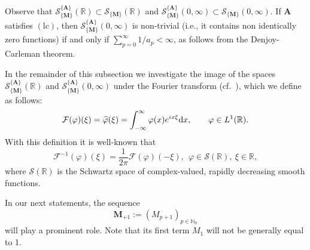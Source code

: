 \documentclass[12pt,a4paper]{article}
\newcommand{\N}{\mathbb{N}}
\newcommand{\R}{\mathbb{R}}
\newcommand{\SMA}{\mathcal{S}^{\{\A\}}_{\{\M\}}}
\newcommand{\M}{{\boldsymbol{M}}}
\newcommand{\A}{{\boldsymbol{A}}}
\newcommand{\dx}{{\rm d}x }
\newcommand{\lc}{\operatorname{(lc)}}
\theoremstyle{plain}
\theoremstyle{definition}
\numberwithin{equation}{section}
\begin{document}
Observe that $\SMA(\R)\subset \mathcal{S}_{\{\M\}}(\R)$ and $\SMA(0,\infty)\subset \mathcal{S}_{\{\M\}}(0,\infty)$. If $\A$ satisfies $\lc$, then $\SMA(0,\infty)$ is non-trivial (i.e., it contains non identically zero functions) if and only if $\sum_{p=0}^\infty 1/a_p<\infty$, as follows from the Denjoy-Carleman theorem.

In the remainder of this subsection we investigate the image of the spaces $\SMA(\R)$ and $\SMA(0,\infty)$
under the Fourier transform (cf.\ \cite[Sect.\ IV.6]{G-S}), which we define as follows:
$$
\mathcal{F}(\varphi)(\xi) = \widehat{\varphi}(\xi) = \int_{-\infty}^\infty \varphi(x) e^{ix\xi} \dx, \qquad \varphi \in L^1(\R).
$$
With this definition it is well-known that
\begin{equation}\label{eq.InverseFourierTransform}
\mathcal{F}^{-1}(\varphi)(\xi)=\frac{1}{2\pi}\mathcal{F}(\varphi)(-\xi),
\ \ \varphi\in\mathcal{S}(\R),\ \xi\in\R,
\end{equation}
where $\mathcal{S}(\R)$ is the Schwartz space of complex-valued, rapidly decreasing smooth functions.

In our next statements, the sequence
$$\M_{+1}:=(M_{p+1})_{p\in\N_0}$$
will play a prominent role. Note that its first term $M_1$ will not be generally equal to 1.
\end{document}
